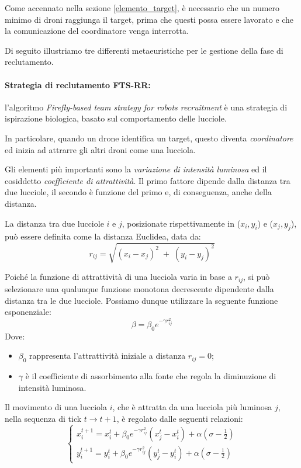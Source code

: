 Come accennato nella sezione \ref{elemento_target}, è necessario che un numero minimo di droni raggiunga il target, prima che questi possa essere lavorato e che la comunicazione del coordinatore venga interrotta.

Di seguito illustriamo tre differenti metaeuristiche per le gestione della fase di reclutamento.

\paragraph{Strategia di reclutamento FTS-RR:} l'algoritmo \textit{Firefly-based team strategy for robots recruitment} è una strategia di ispirazione biologica, basato sul comportamento delle lucciole.

In particolare, quando un drone identifica un target, questo diventa \textit{coordinatore} ed inizia ad attrarre gli altri droni come una lucciola.

Gli elementi più importanti sono la \textit{variazione di intensità luminosa} ed il cosiddetto \textit{coefficiente di attrattività}.
Il primo fattore dipende dalla distanza tra due lucciole, il secondo è funzione del primo e, di conseguenza, anche della distanza.

La distanza tra due lucciole $i$ e $j$, posizionate rispettivamente in ($x_i,y_i$) e ($x_j,y_j$), può essere definita come la distanza Euclidea, data da:
\begin{equation}
    r_{ij} = \sqrt{(x_i - x_j)^2 \; + \; (y_i - y_j)^2}
\end{equation}

Poiché la funzione di attrattività di una lucciola varia in base a $r_{ij}$, si può selezionare una qualunque funzione monotona decrescente dipendente dalla distanza tra le due lucciole.
Possiamo dunque utilizzare la seguente funzione esponenziale:
\begin{equation}\label{rule23}
    \beta = \beta_{0} e^{- \gamma r_{ij}^{2}}
\end{equation}
Dove:
\begin{itemize}
    \item $\beta_{0}$ rappresenta l'attrattività iniziale a distanza $r_{ij} = 0$;
    \item $\gamma$ è il coefficiente di assorbimento alla fonte che regola la diminuzione di intensità luminosa.
\end{itemize}

Il movimento di una lucciola $i$, che è attratta da una lucciola più luminosa $j$, nella sequenza di tick $t \rightarrow t+1$, è regolato dalle seguenti relazioni:
\begin{equation}\label{rule25}
    \begin{cases}
        x_{i}^{t+1} = x_{i}^{t} + \beta_{0} e^{- \gamma r_{ij}^{2}} (x_{j}^{t} - x_{i}^{t}) + \alpha(\sigma - \frac{1}{2}) \\
        y_{i}^{t+1} = y_{i}^{t} + \beta_{0} e^{- \gamma r_{ij}^{2}} (y_{j}^{t} - y_{i}^{t}) + \alpha(\sigma - \frac{1}{2})
    \end{cases}    
\end{equation}

